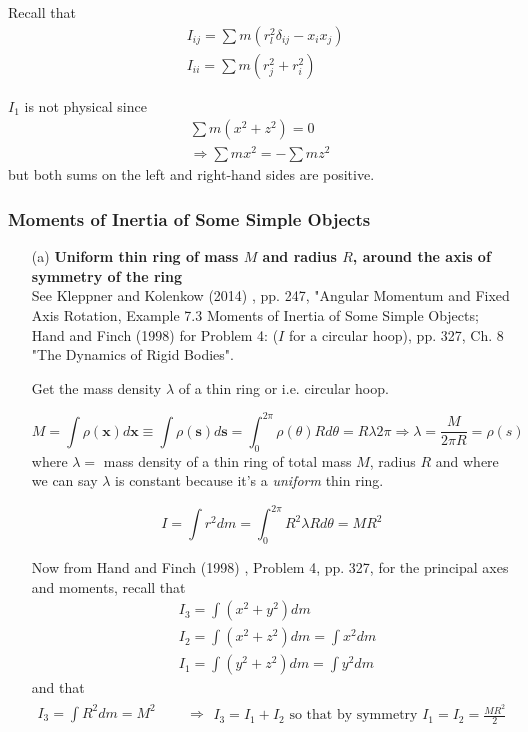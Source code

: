 \documentclass[10pt]{amsart}
\begin{document}
\begin{multicols*}{2}
Recall that 
\[
\begin{aligned}
& I_{ij} = \sum m (r^2_l \delta_{ij} - x_i x_j) \\
& I_{ii} = \sum m (r_j^2 + r_i^2)
\end{aligned}
\]

$I_1$ is not physical since 
\[
\begin{gathered}
\sum m (x^2 + z^2) = 0 \\
\Longrightarrow \sum mx^2 = -\sum mz^2
\end{gathered}
\]
but both sums on the left and right-hand sides are positive.

\subsubsection{Moments of Inertia of Some Simple Objects}

\begin{enumerate}
\item[(a)] \textbf{Uniform thin ring of mass $M$ and radius $R$, around the axis of symmetry of the ring} \\

See Kleppner and Kolenkow (2014) \cite{KlKo2014}, pp. 247, "Angular Momentum and Fixed Axis Rotation, Example 7.3 Moments of Inertia of Some Simple Objects; Hand and Finch (1998) \cite{HaFi1998}
 for Problem 4: ($I$ for a circular hoop), pp. 327, Ch. 8 "The Dynamics of Rigid Bodies".

Get the mass density $\lambda$ of a thin ring or i.e. circular hoop.

\[
M = \int \rho(\mathbf{x}) d\mathbf{x} \equiv \int \rho(\mathbf{s}) d\mathbf{s} = \int_0^{2 \pi} \rho (\theta) R d\theta = R \lambda 2\pi \Longrightarrow \boxed{ \lambda  = \frac{M}{ 2\pi R} = \rho(s)}
\] 
where $\lambda =$ mass density of a thin ring of total mass $M$, radius $R$ and where we can say $\lambda$ is constant because it's a \emph{uniform} thin ring.

\begin{equation}
I = \int r^2 dm  = \int_0^{2\pi} R^2 \lambda R d\theta = MR^2
\end{equation}

Now from Hand and Finch (1998) \cite{HaFi1998}, Problem 4, pp. 327, for the principal axes and moments, recall that
\[
\begin{aligned}
	& I_3 = \int (x^2 + y^2) dm \\
	& I_2 = \int (x^2 + z^2) dm = \int x^2 dm \\
	& I_1 = \int (y^2 +z^2 ) dm = \int y^2 dm
\end{aligned}
\]
and that
\[
\begin{gathered}
I_3 = \int R^2 dm = M^2 
 \quad \quad \, \Longrightarrow 
\begin{gathered}
I_3 = I_1 + I_2 \text{ so that by symmetry } I_1 = I_2 = \frac{MR^2}{2}
\end{gathered}
\end{gathered}
\]


\end{enumerate}
\end{multicols*}
\end{document}

